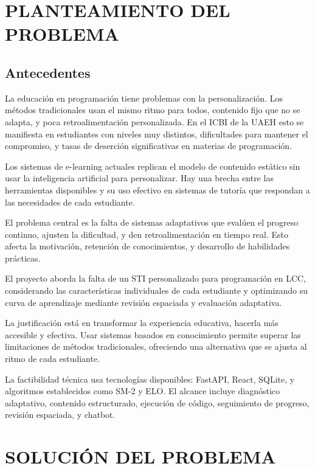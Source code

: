 \documentclass[12pt,letterpaper]{article}
\begin{document}
\newpage
\tableofcontents

\newpage
\section{PLANTEAMIENTO DEL PROBLEMA}

\subsection{Antecedentes}

La educación en programación tiene problemas con la personalización. Los métodos tradicionales usan el mismo ritmo para todos, contenido fijo que no se adapta, y poca retroalimentación personalizada. En el ICBI de la UAEH esto se manifiesta en estudiantes con niveles muy distintos, dificultades para mantener el compromiso, y tasas de deserción significativas en materias de programación.

Los sistemas de e-learning actuales replican el modelo de contenido estático sin usar la inteligencia artificial para personalizar. Hay una brecha entre las herramientas disponibles y su uso efectivo en sistemas de tutoría que respondan a las necesidades de cada estudiante.

El problema central es la falta de sistemas adaptativos que evalúen el progreso continuo, ajusten la dificultad, y den retroalimentación en tiempo real. Esto afecta la motivación, retención de conocimientos, y desarrollo de habilidades prácticas.

El proyecto aborda la falta de un STI personalizado para programación en LCC, considerando las características individuales de cada estudiante y optimizando su curva de aprendizaje mediante revisión espaciada y evaluación adaptativa.

La justificación está en transformar la experiencia educativa, hacerla más accesible y efectiva. Usar sistemas basados en conocimiento permite superar las limitaciones de métodos tradicionales, ofreciendo una alternativa que se ajusta al ritmo de cada estudiante.

La factibilidad técnica usa tecnologías disponibles: FastAPI, React, SQLite, y algoritmos establecidos como SM-2 y ELO. El alcance incluye diagnóstico adaptativo, contenido estructurado, ejecución de código, seguimiento de progreso, revisión espaciada, y chatbot.

\section{SOLUCIÓN DEL PROBLEMA}
\end{document}
